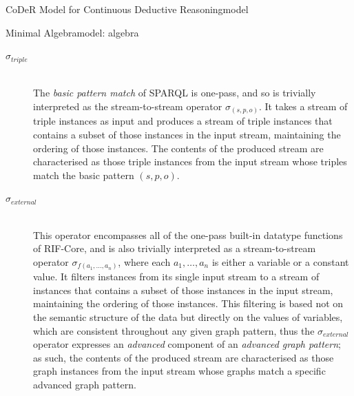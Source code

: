 \begin{nestedsection}{CoDeR Model for Continuous Deductive Reasoning}{model}
\begin{nestedsection}{Minimal Algebra}{model: algebra}
		\begin{description}
			\item[$\sigma_{triple}$] \hfill \\
				The \emph{basic pattern match} of SPARQL is one-pass, and so is trivially interpreted as the stream-to-stream operator $\sigma_{(s,p,o)}$.
				It takes a stream of triple instances as input and produces a stream of triple instances that contains a subset of those instances in the input stream, maintaining the ordering of those instances.
				The contents of the produced stream are characterised as those triple instances from the input stream whose triples match the basic pattern ${(s,p,o)}$.
			\item[$\sigma_{external}$] \hfill \\
				This operator encompasses all of the one-pass built-in datatype functions of RIF-Core, and is also trivially interpreted as a stream-to-stream operator $\sigma_{f(a_1,\dots,a_n)}$, where each ${a_1,\dots,a_n}$ is either a variable or a constant value.
				It filters instances from its single input stream to a stream of instances that contains a subset of those instances in the input stream, maintaining the ordering of those instances.
				This filtering is based not on the semantic structure of the data but directly on the values of variables, which are consistent throughout any given graph pattern, thus the $\sigma_{external}$ operator expresses an \emph{advanced} component of an \emph{advanced graph pattern};
				as such, the contents of the produced stream are characterised as those graph instances from the input stream whose graphs match a specific advanced graph pattern.
		\end{description}
	\end{nestedsection}

\end{nestedsection}